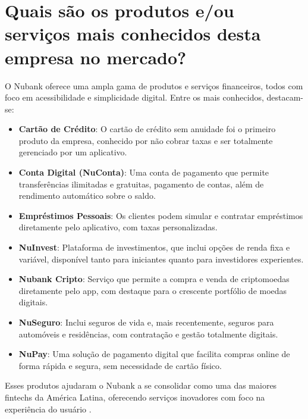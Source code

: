 \section{Quais são os produtos e/ou serviços mais conhecidos desta empresa no mercado?}

O Nubank oferece uma ampla gama de produtos e serviços financeiros, todos com foco em acessibilidade e simplicidade digital. Entre os mais conhecidos, destacam-se:

\begin{itemize}
    \item \textbf{Cartão de Crédito}: O cartão de crédito sem anuidade foi o primeiro produto da empresa, conhecido por não cobrar taxas e ser totalmente gerenciado por um aplicativo.
    \item \textbf{Conta Digital (NuConta)}: Uma conta de pagamento que permite transferências ilimitadas e gratuitas, pagamento de contas, além de rendimento automático sobre o saldo.
    \item \textbf{Empréstimos Pessoais}: Os clientes podem simular e contratar empréstimos diretamente pelo aplicativo, com taxas personalizadas.
    \item \textbf{NuInvest}: Plataforma de investimentos, que inclui opções de renda fixa e variável, disponível tanto para iniciantes quanto para investidores experientes.
    \item \textbf{Nubank Cripto}: Serviço que permite a compra e venda de criptomoedas diretamente pelo app, com destaque para o crescente portfólio de moedas digitais.
    \item \textbf{NuSeguro}: Inclui seguros de vida e, mais recentemente, seguros para automóveis e residências, com contratação e gestão totalmente digitais.
    \item \textbf{NuPay}: Uma solução de pagamento digital que facilita compras online de forma rápida e segura, sem necessidade de cartão físico.
\end{itemize}

Esses produtos ajudaram o Nubank a se consolidar como uma das maiores fintechs da América Latina, oferecendo serviços inovadores com foco na experiência do usuário \cite{nubank2024}.